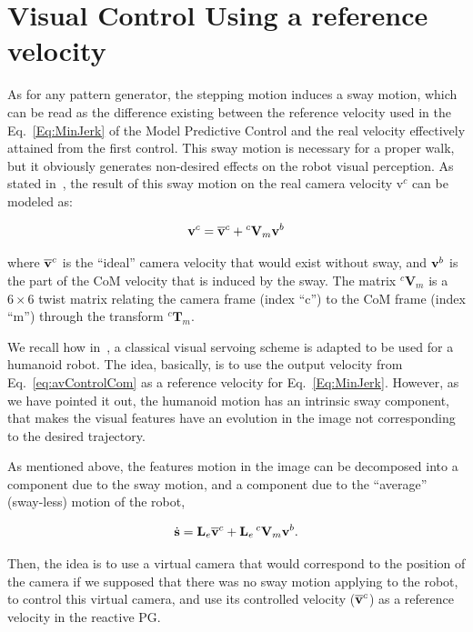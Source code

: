 \section{Visual Control Using a reference velocity}
\label{sec:vsclaire}


As for any pattern generator, the stepping motion induces a sway motion, which can be read as the difference existing between the reference velocity used in the Eq.~\ref{Eq:MinJerk} of the Model Predictive Control and the real velocity effectively attained from the first control. This sway motion is necessary for a proper walk, but it obviously generates non-desired effects on the robot visual perception. As stated in~\citep{DuneIROS2010}, the result of this sway motion on the real camera velocity $\text{v}^c$ can be modeled as:

\begin{equation}
\text{\bf{v}}^c =\overline{\text{\bf{v}}}^c+{^{c} \mathbf V_{m}} \text{\bf{v}}^b
\label{eq:sway}
\end{equation}

where $\overline{\text{\bf{v}}}^c$ is the ``ideal'' camera velocity that would exist without sway, and $\text{\bf{v}}^b$ is the part of the CoM velocity that is induced by the sway. The matrix ${^c \mathbf V_{m}}$ is a $6\times6$ twist matrix relating the camera frame (index ``c'') to the CoM frame (index ``m'') through the transform ${^c \mathbf T_{m}}$.

We recall how in~\citep{DuneIROS2010}, a classical visual servoing scheme is adapted to be used for a humanoid robot. The idea, basically, is to use the output velocity from Eq.~\ref{eq:avControlCom} as a reference velocity for Eq.~\ref{Eq:MinJerk}. However, as we have pointed it out, the humanoid motion has an intrinsic sway component, that makes the visual features have an evolution in the image not corresponding to the desired trajectory. 

As mentioned above, the features motion in the image can be decomposed into a component due to the sway motion, and a component due to the ``average'' (sway-less) motion of the robot,

\begin{equation}
\label{Eq:FeaturesSway}
\dot{\mathbf s}={\mathbf L_e} \overline{\text{\bf{v}}}^c+ {\mathbf L_e} \, ^c \mathbf V_{m}{\text{\bf v}^{b}}.
\end{equation}

Then, the idea is to use a virtual camera that would correspond to the position of the camera if we supposed that there was no sway motion applying to the robot, to control this virtual camera, and use its controlled velocity ($\overline{\text{\bf v}}^c$) as a reference velocity in the reactive PG.
 
